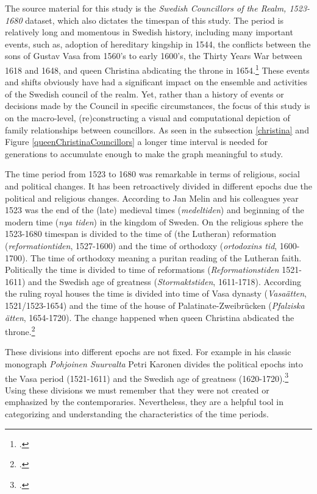 The source material for this study is the \textit{Swedish Councillors of the Realm, 1523-1680} dataset, which also dictates the timespan of this study. The period is relatively long and momentous in Swedish history, including many important events, such as, adoption of hereditary kingship in 1544, the conflicts between the sons of Gustav Vasa from 1560's to early 1600's, the Thirty Years War between 1618 and 1648, and queen Christina abdicating the throne in 1654.\footcite[pp. 8-9.]{personalAgency} These events and shifts obviously have had a significant impact on the ensemble and activities of the Swedish council of the realm. Yet, rather than a history of events or decisions made by the Council in specific circumstances, the focus of this study is on the macro-level, (re)constructing a visual and computational depiction of family relationships between councillors. As seen in the subsection \ref{christina} and Figure \ref{queenChristinaCouncillors} a longer time interval is needed for generations to accumulate enough to make the graph meaningful to study.

The time period from 1523 to 1680 was remarkable in terms of religious, social and political changes. It has been retroactively divided in different epochs due the political and religious changes. According to Jan Melin and his colleagues year 1523 was the end of the (late) medieval times (\textit{medeltiden}) and beginning of the modern time (\textit{nya tiden}) in the kingdom of Sweden. On the religious sphere the 1523-1680 timespan is divided to the time of (the Lutheran) reformation (\textit{reformationtiden}, 1527-1600) and the time of orthodoxy (\textit{ortodoxins tid}, 1600-1700). The time of orthodoxy meaning a puritan reading of the Lutheran faith. Politically the time is divided to time of reformations (\textit{Reformationstiden} 1521-1611) and the Swedish age of greatness (\textit{Stormaktstiden}, 1611-1718). According the ruling royal houses the time is divided into time of Vasa dynasty (\textit{Vasaätten}, 1521/1523-1654) and the time of the house of Palatinate-Zweibrücken (\textit{Pfalziska ätten}, 1654-1720). The change happened when queen Christina abdicated the throne.\footcite[pp. 458-459.]{MelinEtAl}

These divisions into different epochs are not fixed. For example in his classic monograph \textit{Pohjoinen Suurvalta} Petri Karonen divides the political epochs into the Vasa period (1521-1611) and the Swedish age of greatness (1620-1720).\footcite[pp. 7-9.]{pSuurvalta} Using these divisions we must remember that they were not created or emphasized by the contemporaries. Nevertheless, they are a helpful tool in categorizing and understanding the characteristics of the time periods.

